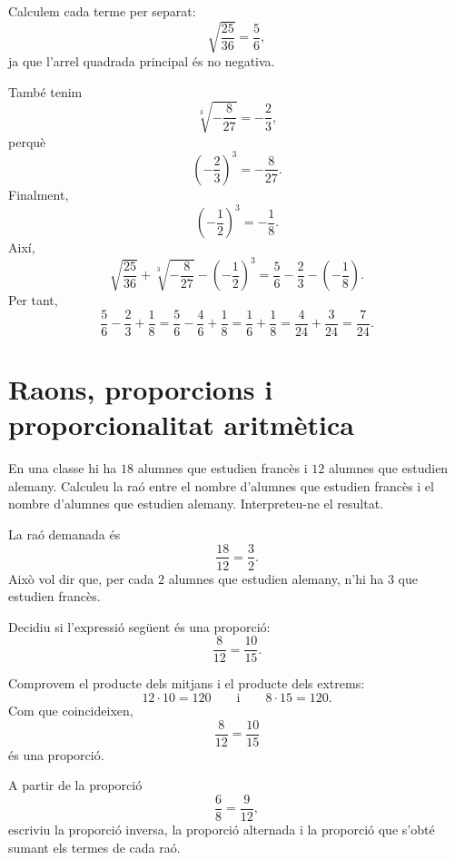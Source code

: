 \begin{solucio}
	Calculem cada terme per separat:
	\[
		\sqrt{\frac{25}{36}}
		=
		\frac{5}{6},
	\]
	ja que l'arrel quadrada principal és no negativa.

	També tenim
	\[
		\sqrt[3]{-\frac{8}{27}}
		=
		-\frac{2}{3},
	\]
	perquè
	\[
		\left(-\frac{2}{3}\right)^3
		=
		-\frac{8}{27}.
	\]
	Finalment,
	\[
		\left(-\frac{1}{2}\right)^3
		=
		-\frac{1}{8}.
	\]
	Així,
	\[
		\sqrt{\frac{25}{36}}
		+
		\sqrt[3]{-\frac{8}{27}}
		-
		\left(-\frac{1}{2}\right)^3
		=
		\frac{5}{6}-\frac{2}{3}-\left(-\frac{1}{8}\right).
	\]
	Per tant,
	\[
		\frac{5}{6}-\frac{2}{3}+\frac{1}{8}
		=
		\frac{5}{6}-\frac{4}{6}+\frac{1}{8}
		=
		\frac{1}{6}+\frac{1}{8}
		=
		\frac{4}{24}+\frac{3}{24}
		=
		\frac{7}{24}.
	\]
\end{solucio}

\section{Raons, proporcions i proporcionalitat aritmètica}

\begin{exercici}
	En una classe hi ha \(18\) alumnes que estudien francès i \(12\) alumnes que estudien alemany. Calculeu la raó entre el nombre d'alumnes que estudien francès i el nombre d'alumnes que estudien alemany. Interpreteu-ne el resultat.
\end{exercici}

\begin{solucio}
	La raó demanada és
	\[
		\frac{18}{12}=\frac{3}{2}.
	\]
	Això vol dir que, per cada \(2\) alumnes que estudien alemany, n'hi ha \(3\) que estudien francès.
\end{solucio}

\begin{exercici}[Proporcions]
	Decidiu si l'expressió següent és una proporció:
	\[
		\frac{8}{12}=\frac{10}{15}.
	\]
\end{exercici}

\begin{solucio}
	Comprovem el producte dels mitjans i el producte dels extrems:
	\[
		12\cdot10=120
		\qquad\text{i}\qquad
		8\cdot15=120.
	\]
	Com que coincideixen,
	\[
		\frac{8}{12}=\frac{10}{15}
	\]
	és una proporció.
\end{solucio}

\begin{exercici}
	A partir de la proporció
	\[
		\frac{6}{8}=\frac{9}{12},
	\]
	escriviu la proporció inversa, la proporció alternada i la proporció que s'obté sumant els termes de cada raó.
\end{exercici}

